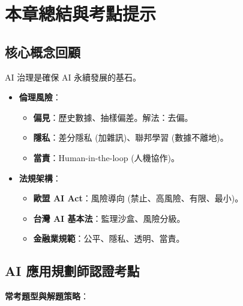 \documentclass[
  letterpaper,
  DIV=11,
  numbers=noendperiod]{scrreprt}
\providecommand{\tightlist}{%
  \setlength{\itemsep}{0pt}\setlength{\parskip}{0pt}}
\begin{document}
\chapter{本章總結與考點提示}\label{chap-chapter11-summary}

\section{核心概念回顧}\label{ux6838ux5fc3ux6982ux5ff5ux56deux9867-10}

AI 治理是確保 AI 永續發展的基石。

\begin{itemize}
\tightlist
\item
  \textbf{倫理風險}：

  \begin{itemize}
  \tightlist
  \item
    \textbf{偏見}：歷史數據、抽樣偏差。解法：去偏。
  \item
    \textbf{隱私}：差分隱私 (加雜訊)、聯邦學習 (數據不離地)。
  \item
    \textbf{當責}：Human-in-the-loop (人機協作)。
  \end{itemize}
\item
  \textbf{法規架構}：

  \begin{itemize}
  \tightlist
  \item
    \textbf{歐盟 AI Act}：風險導向 (禁止、高風險、有限、最小)。
  \item
    \textbf{台灣 AI 基本法}：監理沙盒、風險分級。
  \item
    \textbf{金融業規範}：公平、隱私、透明、當責。
  \end{itemize}
\end{itemize}

\section{AI
應用規劃師認證考點}\label{ai-ux61c9ux7528ux898fux5283ux5e2bux8a8dux8b49ux8003ux9ede-10}

\textbf{常考題型與解題策略}：
\end{document}
